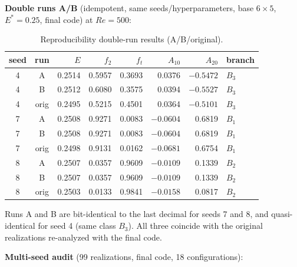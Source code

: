 \documentclass[11pt]{article}
\begin{document}
\textbf{Double runs A/B} (idempotent, same seeds/hyperparameters, base $6\times5$,
$E^*=0.25$, final code) at $Re=500$:

\begin{table}[h]
\centering\small
\caption{Reproducibility double-run results (A/B/original).}
\label{tab:S10a}
\begin{tabular}{ccrrrrrl}
\toprule
seed & run & $E$ & $f_2$ & $f_t$ & $A_{10}$ & $A_{20}$ & branch\\
\midrule
4 & A & 0.2514 & 0.5957 & 0.3693 & 0.0376 & $-0.5472$ & $B_3$\\
4 & B & 0.2512 & 0.6080 & 0.3575 & 0.0394 & $-0.5527$ & $B_3$\\
4 & orig & 0.2495 & 0.5215 & 0.4501 & 0.0364 & $-0.5101$ & $B_3$\\
7 & A & 0.2508 & 0.9271 & 0.0083 & $-0.0604$ & 0.6819 & $B_1$\\
7 & B & 0.2508 & 0.9271 & 0.0083 & $-0.0604$ & 0.6819 & $B_1$\\
7 & orig & 0.2498 & 0.9131 & 0.0162 & $-0.0681$ & 0.6754 & $B_1$\\
8 & A & 0.2507 & 0.0357 & 0.9609 & $-0.0109$ & 0.1339 & $B_2$\\
8 & B & 0.2507 & 0.0357 & 0.9609 & $-0.0109$ & 0.1339 & $B_2$\\
8 & orig & 0.2503 & 0.0133 & 0.9841 & $-0.0158$ & 0.0817 & $B_2$\\
\bottomrule
\end{tabular}
\end{table}

Runs A and B are bit-identical to the last decimal for seeds 7 and 8, and
quasi-identical for seed 4 (same class $B_3$). All three coincide with the
original realizations re-analyzed with the final code.

\textbf{Multi-seed audit} (99 realizations, final code, 18 configurations):
\end{document}

